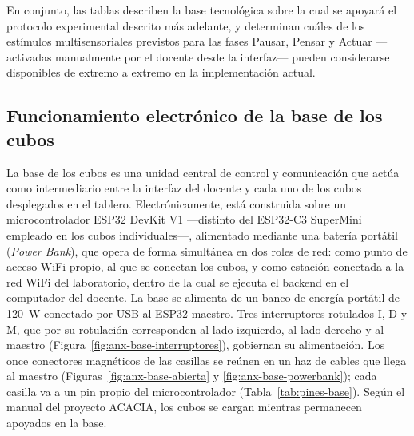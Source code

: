 \documentclass{book}
\begin{document}
En conjunto, las tablas describen la base tecnológica sobre la cual
se apoyará el protocolo experimental descrito más adelante, y
determinan cuáles de los estímulos multisensoriales previstos para las
fases Pausar, Pensar y Actuar —activadas manualmente por el docente
desde la interfaz— pueden considerarse disponibles de extremo a
extremo en la implementación actual.

\subsection{Funcionamiento electrónico de la base de los cubos}
 
La base de los cubos es una unidad central de control y comunicación que
actúa como intermediario entre la interfaz del docente y cada uno de los
cubos desplegados en el tablero. Electrónicamente, está construida sobre
un microcontrolador ESP32 DevKit V1 —distinto del ESP32-C3 SuperMini
empleado en los cubos individuales—, alimentado mediante una batería
portátil (\textit{Power Bank}), que opera de forma simultánea en dos
roles de red: como punto de acceso WiFi propio, al que se conectan los
cubos, y
como estación conectada a la red WiFi del laboratorio, dentro de la cual
se ejecuta el backend en el computador del docente. La
base se alimenta de un banco de energía portátil de 120~W conectado por USB al ESP32 maestro. Tres interruptores rotulados I, D y M, que por su rotulación corresponden al lado izquierdo, al lado derecho y al maestro (Figura~\ref{fig:anx-base-interruptores}), gobiernan su alimentación. Los once conectores magnéticos de las casillas se reúnen en un haz de cables que llega al maestro (Figuras~\ref{fig:anx-base-abierta} y \ref{fig:anx-base-powerbank}); cada casilla va a un pin propio del microcontrolador (Tabla~\ref{tab:pines-base}). Según el manual del proyecto ACACIA, los cubos se cargan mientras permanecen apoyados en la base.
\end{document}
